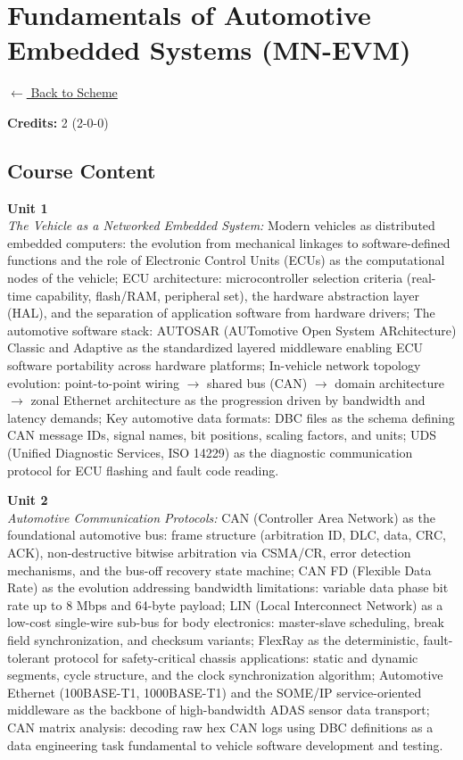 \section*{Fundamentals of Automotive Embedded Systems (MN-EVM)}
\label{minor:EVM_L1}

\noindent \small{\hyperref[main:scheme]{$\leftarrow$ Back to Scheme}} \vspace{0.5cm}

\noindent \textbf{Credits:} 2 (2-0-0)

\subsection*{Course Content}
\noindent\textbf{Unit 1} \\
\textit{The Vehicle as a Networked Embedded System:} Modern vehicles as distributed embedded computers: the evolution from mechanical linkages to software-defined functions and the role of Electronic Control Units (ECUs) as the computational nodes of the vehicle; ECU architecture: microcontroller selection criteria (real-time capability, flash/RAM, peripheral set), the hardware abstraction layer (HAL), and the separation of application software from hardware drivers; The automotive software stack: AUTOSAR (AUTomotive Open System ARchitecture) Classic and Adaptive as the standardized layered middleware enabling ECU software portability across hardware platforms; In-vehicle network topology evolution: point-to-point wiring $\rightarrow$ shared bus (CAN) $\rightarrow$ domain architecture $\rightarrow$ zonal Ethernet architecture as the progression driven by bandwidth and latency demands; Key automotive data formats: DBC files as the schema defining CAN message IDs, signal names, bit positions, scaling factors, and units; UDS (Unified Diagnostic Services, ISO 14229) as the diagnostic communication protocol for ECU flashing and fault code reading.

\vspace{0.3cm}

\noindent\textbf{Unit 2} \\
\textit{Automotive Communication Protocols:} CAN (Controller Area Network) as the foundational automotive bus: frame structure (arbitration ID, DLC, data, CRC, ACK), non-destructive bitwise arbitration via CSMA/CR, error detection mechanisms, and the bus-off recovery state machine; CAN FD (Flexible Data Rate) as the evolution addressing bandwidth limitations: variable data phase bit rate up to 8 Mbps and 64-byte payload; LIN (Local Interconnect Network) as a low-cost single-wire sub-bus for body electronics: master-slave scheduling, break field synchronization, and checksum variants; FlexRay as the deterministic, fault-tolerant protocol for safety-critical chassis applications: static and dynamic segments, cycle structure, and the clock synchronization algorithm; Automotive Ethernet (100BASE-T1, 1000BASE-T1) and the SOME/IP service-oriented middleware as the backbone of high-bandwidth ADAS sensor data transport; CAN matrix analysis: decoding raw hex CAN logs using DBC definitions as a data engineering task fundamental to vehicle software development and testing.

